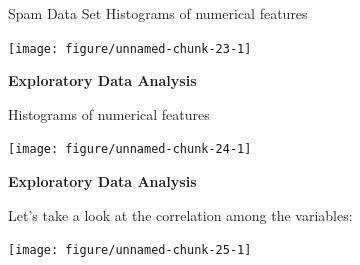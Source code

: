 \documentclass[11pt,compress,t,notes=noshow, xcolor=table]{beamer}
\newenvironment{knitrout}{}{} %
\begin{document}
\begin{vbframe}{Spam Data Set}
Histograms of numerical features

\begin{knitrout}\tiny
{}\color{fgcolor}

{\centering \texttt{[image: figure/unnamed-chunk-23-1]} 

}



\end{knitrout}


\framebreak

\textbf{Exploratory Data Analysis}



Histograms of numerical features

\begin{knitrout}\tiny
{}\color{fgcolor}

{\centering \texttt{[image: figure/unnamed-chunk-24-1]} 

}



\end{knitrout}


\framebreak

\textbf{Exploratory Data Analysis}



Let's take a look at the correlation among the variables:

\begin{knitrout}\tiny
{}\color{fgcolor}

{\centering \texttt{[image: figure/unnamed-chunk-25-1]} 

}



\end{knitrout}

\end{vbframe}
\end{document}
